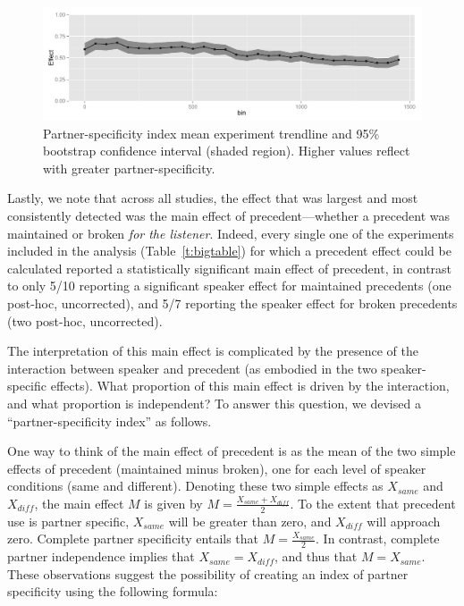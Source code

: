 \documentclass[doc,fignum,apacite,floatsintext]{apa6}
\begin{document}
\begin{figure}
\caption{Partner-specificity index mean experiment trendline and 95\% bootstrap confidence interval (shaded region).  Higher values reflect with greater partner-specificity.}
\label{fig:sspec}
\centerline{\includegraphics[width=6in]{psi.pdf}}
\end{figure}

Lastly, we note that across all studies, the effect that was largest and most consistently detected was the main effect of precedent---whether a precedent was maintained or broken \textit{for the listener}. Indeed, every single one of the experiments included in the analysis (Table~\ref{t:bigtable}) for which a precedent effect could be calculated reported a statistically significant main effect of precedent, in contrast to only 5/10 reporting a significant speaker effect for maintained precedents (one post-hoc, uncorrected), and 5/7 reporting the speaker effect for broken precedents (two post-hoc, uncorrected).

The interpretation of this main effect is complicated by the presence of the interaction between speaker and precedent (as embodied in the two speaker-specific effects).  What proportion of this main effect is driven by the interaction, and what proportion is independent?  To answer this question, we devised a ``partner-specificity index'' as follows.

One way to think of the main effect of precedent is as the mean of the two simple effects of precedent (maintained minus broken), one for each level of speaker conditions (same and different).  Denoting these two simple effects as $X_{same}$ and $X_{diff}$, the main effect $M$ is given by $M = \frac{X_{same}+X_{diff}}{2}$.  To the extent that precedent use is partner specific, $X_{same}$ will be greater than zero, and $X_{diff}$ will approach zero.  Complete partner specificity entails that $M=\frac{X_{same}}{2}$.  In contrast, complete partner independence implies that $X_{same}=X_{diff}$, and thus that $M=X_{same}$.  These observations suggest the possibility of creating an index of partner specificity using the following formula:
\end{document}
